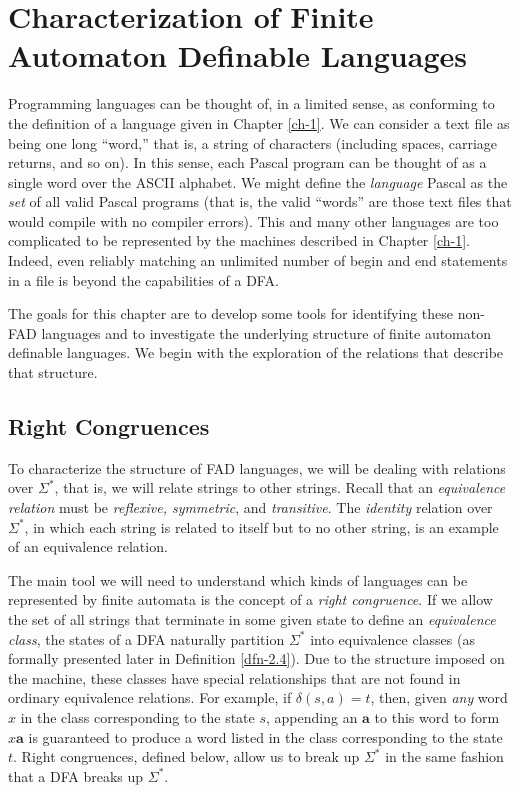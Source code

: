 \chapter{Characterization of Finite Automaton Definable Languages}\label{ch-2}

Programming languages can be thought of, in a limited sense, as
conforming to the definition of a language given in Chapter \ref{ch-1}.
We can consider a text file as being one long ``word,'' that is, a
string of characters (including spaces, carriage returns, and so
on). In this sense, each Pascal program can be thought of as a
single word over the ASCII alphabet. We might define the \emph{language}
Pascal as the \emph{set} of all valid Pascal programs (that is, the valid
``words'' are those text files that would compile with no compiler
errors). This and many other languages are too complicated to be
represented by the machines described in Chapter \ref{ch-1}. Indeed,
even reliably matching an unlimited number of begin and end statements
in a file is beyond the capabilities of a DFA.

The goals for this chapter are to develop some tools for identifying
these non-FAD languages and to investigate the underlying structure
of finite automaton definable languages. We begin with the exploration
of the relations that describe that structure.

\section{Right Congruences}\label{sec-2.1}

To characterize the structure of FAD languages, we will be dealing
with relations over $\Sigma^*$, that is, we will relate strings to
other strings.  Recall that an \emph{equivalence relation} must be
\emph{reflexive, symmetric}, and \emph{transitive}. The \emph{identity}
relation over $\Sigma^*$, in which each string is related to itself
but to no other string, is an example of an equivalence relation.

The main tool we will need to understand which kinds of languages
can be represented by finite automata is the concept of a \emph{right
congruence}. If we allow the set of all strings that terminate in
some given state to define an \emph{equivalence class}, the states
of a DFA naturally partition $\Sigma^*$ into equivalence classes
(as formally presented later in Definition \ref{dfn-2.4}). Due to
the structure imposed on the machine, these classes have special
relationships that are not found in ordinary equivalence relations.
For example, if $\delta(s, a) = t$, then, given \emph{any} word $x$
in the class corresponding to the state $s$, appending an $\mathbf{a}$
to this word to form $x \mathbf{a}$ is guaranteed to produce a word
listed in the class corresponding to the state $t$. Right congruences,
defined below, allow us to break up $\Sigma^*$ in the same fashion
that a DFA breaks up $\Sigma^*$.

